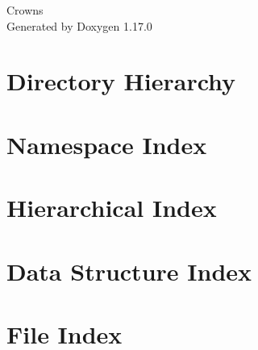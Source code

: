 \documentclass[twoside]{book}
\newcommand{\+}{\discretionary{\mbox{\scriptsize$\hookleftarrow$}}{}{}}
\newcommand{\clearemptydoublepage}{%
    \newpage{\pagestyle{empty}\cleardoublepage}%
  }
\begin{document}
  \raggedbottom
    \hypersetup{pageanchor=false,
                bookmarksnumbered=true,
                pdfencoding=unicode
               }
  \begin{titlepage}
  \vspace*{7cm}
  \begin{center}%
  {\Large Crowns}\\
  \vspace*{1cm}
  {\large Generated by Doxygen 1.17.0}\\
  \end{center}
  \end{titlepage}
  \clearemptydoublepage
  \tableofcontents
  \clearemptydoublepage
  \hypersetup{pageanchor=true}

\chapter{Directory Hierarchy}

\chapter{Namespace Index}

\chapter{Hierarchical Index}

\chapter{Data Structure Index}

\chapter{File Index}

\end{document}

